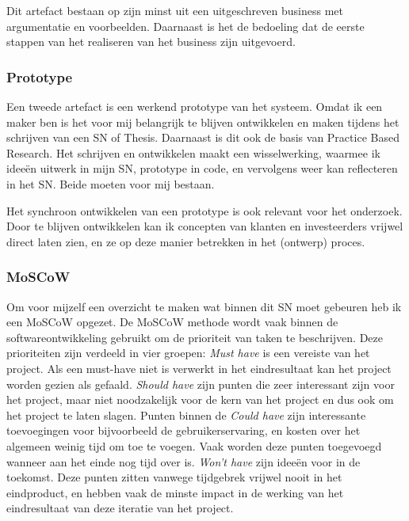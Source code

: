 Dit artefact bestaan op zijn minst uit een uitgeschreven business met argumentatie en voorbeelden. Daarnaast is het de bedoeling dat de eerste stappen van het realiseren van het business zijn uitgevoerd.

\subsubsection*{Prototype}
Een tweede artefact is een werkend prototype van het systeem. Omdat ik een maker ben is het voor mij belangrijk te blijven ontwikkelen en maken tijdens het schrijven van een SN of Thesis. Daarnaast is dit ook de basis van Practice Based Research. Het schrijven en ontwikkelen maakt een wisselwerking, waarmee ik ideeën uitwerk in mijn SN, prototype in code, en vervolgens weer kan reflecteren in het SN. Beide moeten voor mij bestaan.

Het synchroon ontwikkelen van een prototype is ook relevant voor het onderzoek. Door te blijven ontwikkelen kan ik concepten van klanten en investeerders vrijwel direct laten zien, en ze op deze manier betrekken in het (ontwerp) proces.

\subsubsection*{MoSCoW}
Om voor mijzelf een overzicht te maken wat binnen dit SN moet gebeuren heb ik een MoSCoW opgezet. De MoSCoW methode wordt vaak binnen de softwareontwikkeling gebruikt om de prioriteit van taken te beschrijven. Deze prioriteiten zijn verdeeld in vier groepen: \textit{Must have} is een vereiste van het project. Als een must-have niet is verwerkt in het eindresultaat kan het project worden gezien als gefaald. \textit{Should have} zijn punten die zeer interessant zijn voor het project, maar niet noodzakelijk voor de kern van het project en dus ook om het project te laten slagen. Punten binnen de \textit{Could have} zijn interessante toevoegingen voor bijvoorbeeld de gebruikerservaring, en kosten over het algemeen weinig tijd om toe te voegen. Vaak worden deze punten toegevoegd wanneer aan het einde nog tijd over is. \textit{Won't have} zijn ideeën voor in de toekomst. Deze punten zitten vanwege tijdgebrek vrijwel nooit in het eindproduct, en hebben vaak de minste impact in de werking van het eindresultaat van deze iteratie van het project.

